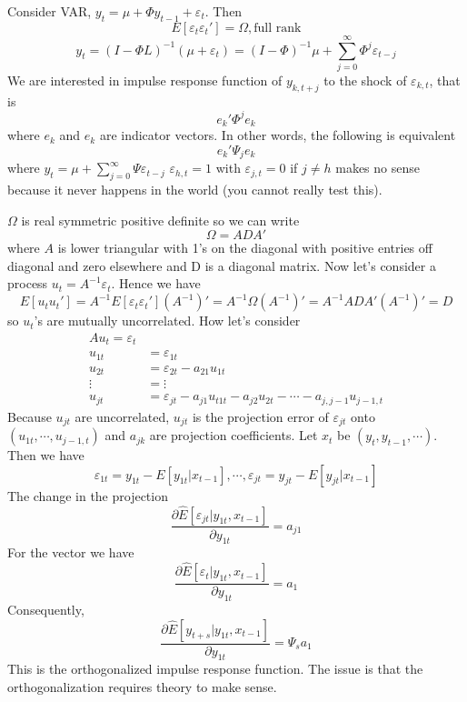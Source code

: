 \documentclass[11pt, a4paper, oneside]{article}
\theoremstyle{definition}
\theoremstyle{proposition}
\theoremstyle{corollary}
\theoremstyle{lemma}
\theoremstyle{theorem}
\begin{document}
Consider VAR, $y_t = \mu + \Phi y_{t-1} + \varepsilon_t$. Then
$$E[\varepsilon_t\varepsilon_t'] = \Omega, \text{full rank}$$
$$y_t = (I - \Phi L)^{-1}(\mu + \varepsilon_t) = (I-\Phi)^{-1}\mu + \sum_{j =0}^{\infty}\Phi^j \varepsilon_{t-j}$$ 
We are interested in impulse response function of $y_{k, t+j}$ to the shock of $\varepsilon_{k, t}$, that is
$$e_k'\Phi^j e_k$$ where $e_k$ and $e_k$ are indicator vectors. In other words, the following is equivalent
$$e_k'\Psi_j e_k$$ where $y_t = \mu + \sum_{j=0}^{\infty}\Psi \varepsilon_{t-j}$
$\varepsilon_{h, t} = 1$ with $\varepsilon_{j ,t} = 0$ if $j \neq h$ makes no sense because it never happens in the world (you cannot really test this). 

$\Omega$ is real symmetric positive definite so we can write
$$\Omega = ADA'$$ where $A$ is lower triangular with 1's on the diagonal with positive entries off diagonal and zero elsewhere and D is a diagonal matrix. Now let's consider a process $u_t = A^{-1}\varepsilon_t$. Hence we have
$$E[u_tu_t'] = A^{-1}E[\varepsilon_t\varepsilon_t'](A^{-1})' = A^{-1}\Omega(A^{-1})' = A^{-1}AD A'(A^{-1})' = D$$ 
so $u_t$'s are mutually uncorrelated. How let's consider
\begin{align*}
Au_t = \varepsilon_t \\
u_{1t} & = \varepsilon_{1t}\\
u_{2t} & = \varepsilon_{2t} - a_{21}u_{1t}\\
\vdots & = \vdots \\
u_{jt} & = \varepsilon_{jt} - a_{j1}u_{t1t} - a_{j2}u_{2t} -\cdots - a_{j, j-1}u_{j-1, t}
\end{align*}
Because $u_{jt}$ are uncorrelated, $u_{jt}$ is the projection error of $\varepsilon_{ jt}$ onto $(u_{1t}, \cdots, u_{j-1, t})$ and $a_{jk}$ are projection coefficients. Let $x_t$ be $(y_t, y_{t-1}, \cdots)$. Then we have
$$\varepsilon_{1t}= y_{1t} - E[y_{1t}|x_{t-1}], \cdots, \varepsilon_{jt} = y_{jt} - E[y_{jt}|x_{t-1}]$$
The change in the projection $$\frac{\partial \hat{E}[\varepsilon_{jt}|y_{1t}, x_{t-1}]}{\partial y_{1t}} = a_{j1}$$
For the vector we have
$$\frac{\partial \hat{E}[\varepsilon_{t}|y_{1t}, x_{t-1}]}{\partial y_{1t}} = a_{1}$$
Consequently, 
$$\frac{\partial \hat{E}[y_{t+s}|y_{1t}, x_{t-1}]}{\partial y_{1t}} = \Psi_s a_1$$
This is the orthogonalized impulse response function. The issue is that the orthogonalization requires theory to make sense. 
\end{document}
